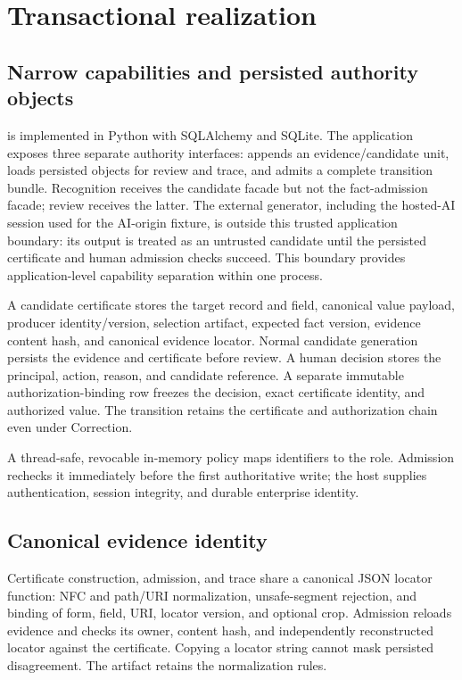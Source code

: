 \section{Transactional realization}
\label{sec:realization}

\subsection{Narrow capabilities and persisted authority objects}

\system{} is implemented in Python with SQLAlchemy and SQLite. The application exposes three separate authority interfaces:  appends an evidence/candidate unit,  loads persisted objects for review and trace, and  admits a complete transition bundle. Recognition receives the candidate facade but not the fact-admission facade; review receives the latter. The external generator, including the hosted-AI session used for the AI-origin fixture, is outside this trusted application boundary: its output is treated as an untrusted candidate until the persisted certificate and human admission checks succeed. This boundary provides application-level capability separation within one process.

A candidate certificate stores the target record and field, canonical value payload, producer identity/version, selection artifact, expected fact version, evidence content hash, and canonical evidence locator. Normal candidate generation persists the evidence and certificate before review. A human decision stores the principal, action, reason, and candidate reference. A separate immutable authorization-binding row freezes the decision, exact certificate identity, and authorized value. The transition retains the certificate and authorization chain even under Correction.

A thread-safe, revocable in-memory policy maps identifiers to the  role. Admission rechecks it immediately before the first authoritative write; the host supplies authentication, session integrity, and durable enterprise identity.

\subsection{Canonical evidence identity}

Certificate construction, admission, and trace share a canonical JSON locator function: NFC and path/URI normalization, unsafe-segment rejection, and binding of form, field, URI, locator version, and optional crop. Admission reloads evidence and checks its owner, content hash, and independently reconstructed locator against the certificate. Copying a locator string cannot mask persisted disagreement. The artifact retains the normalization rules.

